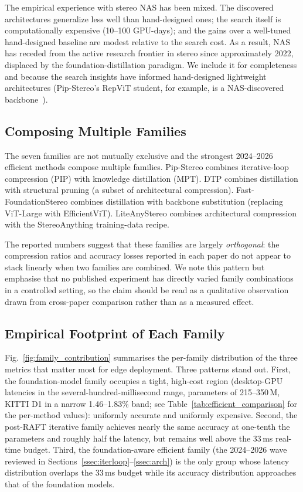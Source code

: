 The empirical experience with stereo NAS has been mixed. The discovered architectures generalize less well than hand-designed ones; the search itself is computationally expensive (10--100 GPU-days); and the gains over a well-tuned hand-designed baseline are modest relative to the search cost. As a result, NAS has receded from the active research frontier in stereo since approximately 2022, displaced by the foundation-distillation paradigm. We include it for completeness and because the search insights have informed hand-designed lightweight architectures (Pip-Stereo's RepViT student, for example, is a NAS-discovered backbone~\cite{zheng2026pipstereo}).

\subsection{Composing Multiple Families}
\label{ssec:composition}

The seven families are not mutually exclusive and the strongest 2024--2026 efficient methods compose multiple families. Pip-Stereo combines iterative-loop compression (PIP) with knowledge distillation (MPT). DTP combines distillation with structural pruning (a subset of architectural compression). Fast-FoundationStereo combines distillation with backbone substitution (replacing ViT-Large with EfficientViT). LiteAnyStereo combines architectural compression with the StereoAnything training-data recipe.

The reported numbers suggest that these families are largely \emph{orthogonal}: the compression ratios and accuracy losses reported in each paper do not appear to stack linearly when two families are combined. We note this pattern but emphasise that no published experiment has directly varied family combinations in a controlled setting, so the claim should be read as a qualitative observation drawn from cross-paper comparison rather than as a measured effect.

\subsection{Empirical Footprint of Each Family}
\label{ssec:empirical}

Fig.~\ref{fig:family_contribution} summarises the per-family distribution of the three metrics that matter most for edge deployment. Three patterns stand out. First, the foundation-model family occupies a tight, high-cost region (desktop-GPU latencies in the several-hundred-millisecond range, parameters of 215--350\,M, KITTI D1 in a narrow 1.46--1.83\% band; see Table~\ref{tab:efficient_comparison} for the per-method values): uniformly accurate and uniformly expensive. Second, the post-RAFT iterative family achieves nearly the same accuracy at one-tenth the parameters and roughly half the latency, but remains well above the 33\,ms real-time budget. Third, the foundation-aware efficient family (the 2024--2026 wave reviewed in Sections~\ref{ssec:iterloop}--\ref{ssec:arch}) is the only group whose latency distribution overlaps the 33\,ms budget while its accuracy distribution approaches that of the foundation models.

